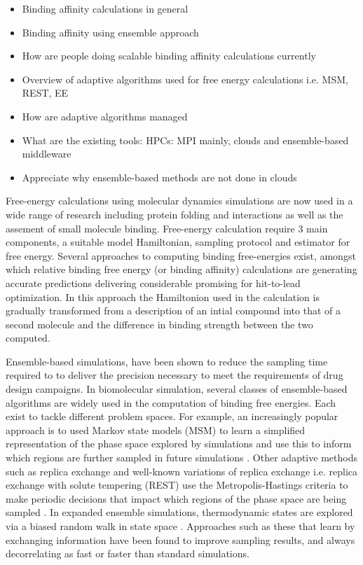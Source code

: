 \begin{itemize}
  \item Binding affinity calculations in general
  \item Binding affinity using ensemble approach
  \item How are people doing scalable binding affinity calculations currently
  \item Overview of adaptive algorithms used for free energy calculations i.e. 
  MSM, REST, EE 
  \item How are adaptive algorithms managed
  \item What are the existing tools: HPCs: MPI mainly, clouds and 
  ensemble-based middleware 
  \item Appreciate why ensemble-based methods are not done in clouds
\end{itemize}

Free-energy calculations using molecular dynamics simulations are now used in 
a wide range of research including protein folding and interactions as well as
the assement of small molecule binding. 
Free-energy calculation require 3 main components, a suitable model Hamiltonian,
sampling protocol and estimator for free energy. 
Several approaches to computing binding free-energies exist, amongst which relative 
binding free energy (or binding affinity) calculations are generating accurate 
predictions delivering considerable promising for hit-to-lead optimization. 
In this approach the Hamiltonion used in the calculation is gradually transformed 
from a description of an intial compound into that of a second molecule and the 
difference in binding strength between the two computed.


Ensemble-based simulations, have been shown to reduce the sampling time required to 
to deliver the precision necessary to meet the requirements of drug design campaigns.
In biomolecular simulation, several classes of ensemble-based algorithms are widely used 
in the computation of binding free energies. 
Each exist to tackle different problem spaces. 
For example, an increasingly popular approach is to
used Markov state models (MSM) to learn a simplified representation of the
phase space explored by simulations and use this to inform which regions are
further sampled in future simulations \cite{Bowman2010}.
Other adaptive methods such as replica exchange and well-known variations of
replica exchange i.e. replica exchange with solute tempering (REST) use the
Metropolis-Hastings criteria to make periodic decisions that impact which
regions of the phase space are being sampled \cite{Earl2005, Hritz2008, Kim2012}.
In expanded ensemble simulations, thermodynamic states are explored via a biased 
random walk in state space \cite{Lyubartsev1992}.
Approaches such as these that learn by exchanging information have been found to
improve sampling results, and always decorrelating as fast or faster than standard 
simulations.

